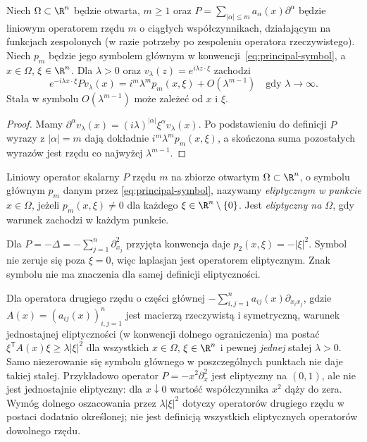 \begin{stwierdzenie}
Niech $\Omega\subset\R^n$ będzie otwarta, $m\geq1$ oraz
$P=\sum_{|\alpha|\leq m}a_\alpha(x)\partial^\alpha$ będzie liniowym
operatorem rzędu $m$ o ciągłych współczynnikach, działającym na
funkcjach zespolonych (w razie potrzeby po zespoleniu operatora
rzeczywistego). Niech $p_m$ będzie jego symbolem głównym
w konwencji~\eqref{eq:principal-symbol}, a $x\in\Omega$, $\xi\in\R^n$. Dla $\lambda>0$ oraz
$v_\lambda(z)=e^{i\lambda z\cdot\xi}$ zachodzi
\[
 e^{-i\lambda x\cdot\xi}Pv_\lambda(x)
 =i^m\lambda^m p_m(x,\xi)+O(\lambda^{m-1})
 \quad\text{gdy }\lambda\to\infty.
\]
Stała w symbolu $O(\lambda^{m-1})$ może zależeć od $x$ i $\xi$.
\end{stwierdzenie}
\begin{proof}
Mamy $\partial^\alpha v_\lambda(x)=
(i\lambda)^{|\alpha|}\xi^\alpha v_\lambda(x)$.
Po podstawieniu do definicji $P$ wyrazy z $|\alpha|=m$
dają dokładnie $i^m\lambda^mp_m(x,\xi)$, a skończona
suma pozostałych wyrazów jest rzędu co najwyżej $\lambda^{m-1}$.
\end{proof}

\begin{definicja}[Eliptyczność]
Liniowy operator skalarny $P$ rzędu $m$ na zbiorze otwartym
$\Omega\subset\R^n$, o symbolu głównym $p_m$ danym przez
\eqref{eq:principal-symbol}, nazywamy \emph{eliptycznym w punkcie}
$x\in\Omega$, jeżeli $p_m(x,\xi)\ne0$ dla każdego
$\xi\in\R^n\setminus\{0\}$. Jest \emph{eliptyczny na $\Omega$},
gdy warunek zachodzi w każdym punkcie.
\end{definicja}

\begin{przyklad}
Dla $P=-\Delta=-\sum_{j=1}^n\partial_{x_j}^2$
przyjęta konwencja daje $p_2(x,\xi)=-|\xi|^2$.
Symbol nie zeruje się poza $\xi=0$, więc laplasjan jest
operatorem eliptycznym. Znak symbolu nie ma znaczenia
dla samej definicji eliptyczności.
\end{przyklad}

\begin{uwaga}
Dla operatora drugiego rzędu o części głównej
$-\sum_{i,j=1}^n a_{ij}(x)\partial_{x_ix_j}$, gdzie
$A(x)=(a_{ij}(x))_{i,j=1}^n$ jest macierzą rzeczywistą i symetryczną,
warunek jednostajnej eliptyczności (w konwencji dolnego
ograniczenia) ma postać
$\xi^{\mathsf T}A(x)\xi\ge\lambda|\xi|^2$
dla wszystkich $x\in\Omega$, $\xi\in\R^n$ i pewnej
\emph{jednej} stałej $\lambda>0$. Samo niezerowanie się
symbolu głównego w poszczególnych punktach nie daje
takiej stałej. Przykładowo operator
$P=-x^2\partial_x^2$ jest eliptyczny na $(0,1)$,
ale nie jest jednostajnie eliptyczny: dla $x\downarrow0$
wartość współczynnika $x^2$ dąży do zera.
Wymóg dolnego oszacowania przez $\lambda|\xi|^2$
dotyczy operatorów drugiego rzędu w postaci dodatnio
określonej; nie jest definicją wszystkich eliptycznych
operatorów dowolnego rzędu.
\end{uwaga}

